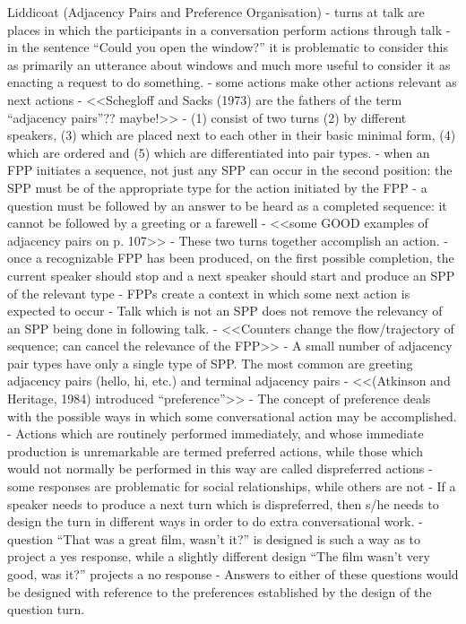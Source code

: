 \documentclass[11pt]{article}
\begin{document}
Liddicoat (Adjacency Pairs and Preference Organisation)
- turns at talk are places in which the participants in a conversation perform actions through talk
- in the sentence ``Could you open the window?'' it is problematic to consider this as primarily an utterance about windows and much more useful to consider it as enacting a request to do something.
- some actions make other actions relevant as next actions
- <<Schegloff and Sacks (1973) are the fathers of the term ``adjacency pairs''?? maybe!>>
- (1) consist of two turns (2) by different speakers, (3) which are placed next to each other in their basic minimal form, (4) which are ordered and (5) which are differentiated into pair types.
- when an FPP initiates a sequence, not just any SPP can occur in the second position: the SPP must be of the appropriate type for the action initiated by the FPP
- a question must be followed by an answer to be heard as a completed sequence: it cannot be followed by a greeting or a farewell
- <<some GOOD examples of adjacency pairs on p. 107>>
- These two turns together accomplish an action.
- once a recognizable FPP has been produced, on the first possible completion, the current speaker should stop and a next speaker should start and produce an SPP of the
relevant type
- FPPs create a context in which some next action is expected to occur
- Talk which is not an SPP does not remove the relevancy of an SPP being done in following talk.
- <<Counters change the flow/trajectory of sequence; can cancel the relevance of the FPP>>
- A small number of adjacency pair types have only a single type of SPP. The most common are greeting adjacency pairs (hello, hi, etc.) and terminal adjacency pairs
- <<(Atkinson and Heritage, 1984) introduced ``preference''>>
- The concept of preference deals with the possible ways in which some conversational action may be accomplished.
- Actions which are routinely performed immediately, and whose immediate production is unremarkable are termed preferred actions, while those which would not normally be performed in this way are called dispreferred actions
- some responses are problematic for social relationships, while others are not
- If a speaker needs to produce a next turn which is dispreferred, then s/he needs to design the turn in different ways in order to do extra conversational work.
- question ``That was a great film, wasn't it?'' is designed is such a way as to project a yes response, while a slightly different design ``The film wasn't very good, was it?'' projects a no response
- Answers to either of these questions would be designed with reference to the preferences established by the design of the question turn.
\end{document}
